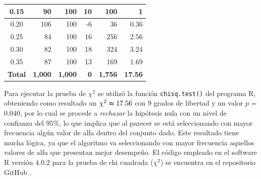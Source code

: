 \documentclass{article}
\begin{document}
\begin{table}
\begin{tabular}{|c|r|r|r|r|r|}
0.15                                 & 90                                                                             & 100                                                                           & 10                       & 100                            & 1                                \\ \hline
0.20                                 & 106                                                                            & 100                                                                           & -6                       & 36                             & 0.36                             \\ \hline
0.25                                 & 84                                                                             & 100                                                                           & 16                       & 256                            & 2.56                             \\ \hline
0.30                                 & 82                                                                             & 100                                                                           & 18                       & 324                            & 3.24                             \\ \hline
0.35                                 & 87                                                                             & 100                                                                           & 13                       & 169                            & 1.69                             \\ \hline
\multicolumn{1}{|l|}{\textbf{Total}} & \textbf{1,000}                                                                 & \textbf{1,000}                                                                & \textbf{0}               & \textbf{1,756}                 & \textbf{17.56}                   \\ \hline
\end{tabular}
\label{tablacontingencia}
\end{table}

Para ejecutar la prueba de $\chi^{2}$ se utilizó la función \texttt{chisq.test()} del programa R, obteniendo como resultado un  $\chi^{2} \thickapprox 17.56$ con $9$ grados de libertad y un valor $p$ = $0.040$, por lo cual se procede a \textit{rechazar} la hipótesis nula con un nivel de confianza del $95\%$, lo que implica que al parecer se está seleccionando con mayor frecuencia algún valor de alfa dentro del conjunto dado. Este resultado tiene mucha lógica, ya que el algoritmo va seleccionando con mayor frecuencia aquellos valores de alfa que presentan mejor desempeño. El código empleado en el software R versión 4.0.2 para la prueba de chi cuadrada ($\chi^{2}$) se encuentra en el repositorio GitHub \cite{github}.
\end{document}
